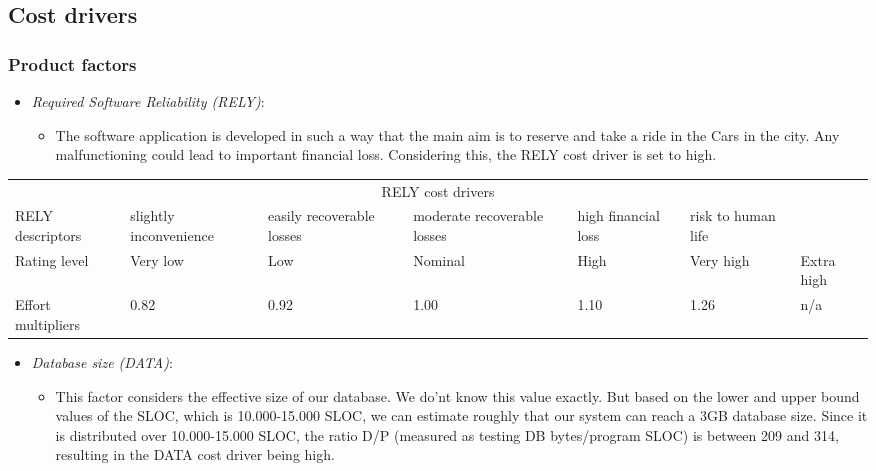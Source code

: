 \subsection{Cost drivers}

\subsubsection{Product factors}

\begin{itemize}
	\item \emph{Required Software Reliability (RELY)}:
	\begin{itemize}
			\item[] The software application is developed in such a way that the main aim is to reserve and take a ride in the Cars in the city. Any malfunctioning could lead to important financial loss. Considering this, the RELY cost driver is set to high.
	\end{itemize}
\end{itemize}

\begin{table}[H]
	\hspace*{-1.7cm}
	\begin{tabular}{|p{2cm}|p{2cm}|p{2cm}|p{2cm}|p{2cm}|p{2cm}|p{2cm}|}
		\hline
		\multicolumn{7}{|c|}{RELY cost drivers} \\
		\hhline{|=======|}
		RELY descriptors & slightly inconvenience & easily recoverable losses & moderate recoverable losses & high financial loss & risk to human life & \\
		\hline
		Rating level & Very low & Low & Nominal & High & Very high & Extra high \\
		\hline
		Effort multipliers & 0.82 & 0.92 & 1.00 & 1.10 & 1.26 & n/a \\
		\hline
	\end{tabular}
\end{table}

\begin{itemize}
	\item \emph{Database size (DATA)}:
	\begin{itemize}
		 \item[] This factor considers the effective size of our database. We do'nt know this value exactly. But based on the lower and upper bound
values of the SLOC, which is 10.000-15.000 SLOC, we can estimate roughly that our system can reach a 3GB database size. Since it is
distributed over 10.000-15.000 SLOC, the ratio D/P (measured as testing DB bytes/program SLOC) is between 209 and 314,
resulting in the DATA cost driver being high.
	\end{itemize}
\end{itemize}

